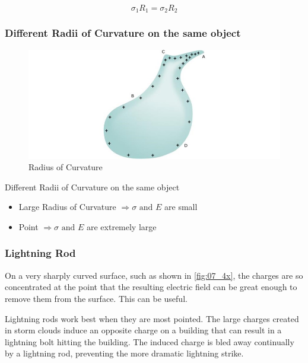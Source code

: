 \documentclass[14pt]{memoir}
\begin{document}
\begin{equation}
\sigma_1 R_1 = \sigma_2 R_2
\end{equation}

\subsubsection{Different Radii of Curvature on the same object}

\begin{figure}[H]
\begin{center}
\includegraphics[scale=0.50]{fig/fig_07_40.jpg}
\caption{Radius of Curvature}
\label{fig:07_40}
\end{center}
\end{figure}

Different Radii of Curvature on the same object
\begin{itemize}
\item Large Radius of Curvature $\Rightarrow \sigma \text{ and } E$ are small
\item Point $\Rightarrow \sigma \text{ and } E$ are extremely large
\end{itemize}

\subsubsection{Lightning Rod}

On a very sharply curved surface, such as shown in \ref{fig:07_4x}, the charges are so concentrated at the point that the resulting electric field can be great enough to remove them from the surface. This can be useful.

Lightning rods work best when they are most pointed. The large charges created in storm clouds induce an opposite charge on a building that can result in a lightning bolt hitting the building. The induced charge is bled away continually by a lightning rod, preventing the more dramatic lightning strike.
\end{document}
